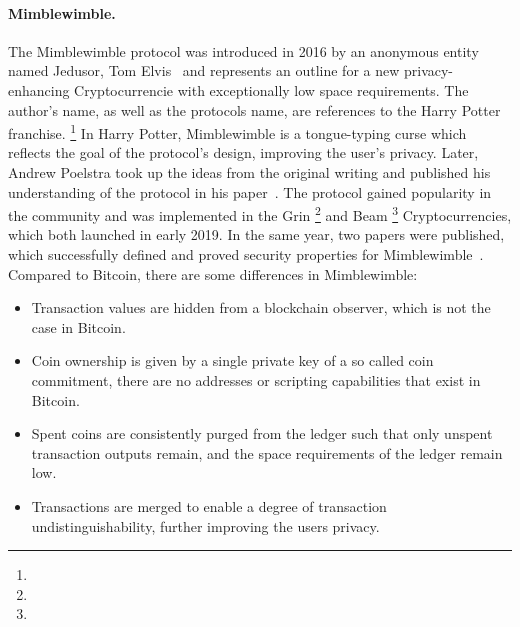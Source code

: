 \paragraph{Mimblewimble.} The Mimblewimble protocol was introduced in 2016 by an anonymous entity named Jedusor, Tom Elvis~\cite{jedusor2016mimblewimble} and represents an outline for a new privacy-enhancing Cryptocurrencie with exceptionally low space requirements.
The author's name, as well as the protocols name, are references to the Harry Potter franchise. \footnote{\urlharrypotter}
In Harry Potter, Mimblewimble is a tongue-typing curse which reflects the goal of the protocol's design, improving the user's privacy.
Later, Andrew Poelstra took up the ideas from the original writing and published his understanding of the protocol in his paper~\cite{poelstra2016mimblewimble}.
The protocol gained popularity in the community and was implemented in the Grin \footnote{\urlgrin} and Beam \footnote{\urlbeam} Cryptocurrencies, which both launched in early 2019.
In the same year, two papers were published, which successfully defined and proved security properties for Mimblewimble~\cite{fuchsbauer2019aggregate,betarte2019towards}.
Compared to Bitcoin, there are some differences in Mimblewimble:
\begin{itemize}
    \item Transaction values are hidden from a blockchain observer, which is not the case in Bitcoin.
    \item Coin ownership is given by a single private key of a so called coin commitment, there are no addresses or scripting capabilities that exist in Bitcoin.
    \item Spent coins are consistently purged from the ledger such that only unspent transaction outputs remain, and the space requirements of the ledger remain low.
    \item Transactions are merged to enable a degree of transaction undistinguishability, further improving the users privacy.
\end{itemize}

